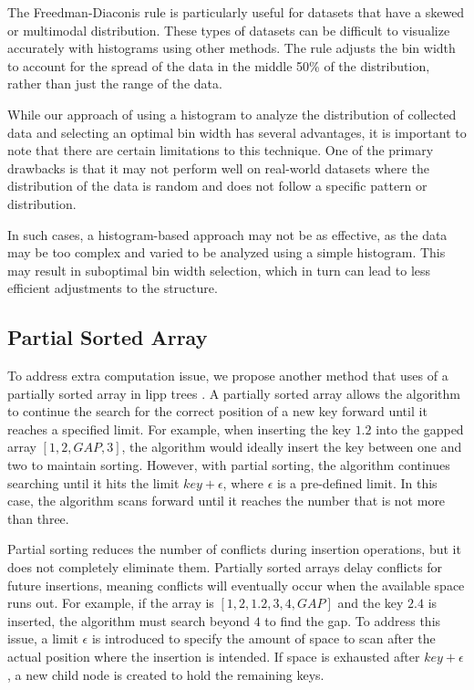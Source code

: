 The Freedman-Diaconis rule is particularly useful for datasets that have a skewed or multimodal distribution. These types of datasets can be difficult to visualize accurately with histograms using other methods. The rule adjusts the bin width to account for the spread of the data in the middle 50\% of the distribution, rather than just the range of the data. 

While our approach of using a histogram to analyze the distribution of collected data and selecting an optimal bin width has several advantages, it is important to note that there are certain limitations to this technique. One of the primary drawbacks is that it may not perform well on real-world datasets where the distribution of the data is random and does not follow a specific pattern or distribution.

In such cases, a histogram-based approach may not be as effective, as the data may be too complex and varied to be analyzed using a simple histogram. This may result in suboptimal bin width selection, which in turn can lead to less efficient adjustments to the \learnindex structure.



\subsection{Partial Sorted Array} \label{partialsorted}
To address extra computation issue, we propose another method that uses of a partially sorted array in \acrshort{lipp} trees \cite{partialMonotonic}. A partially sorted array allows the algorithm to continue the search for the correct position of a new key forward until it reaches a specified limit. For example, when inserting the key $1.2$ into the gapped array $[1,2, GAP,3]$, the algorithm would ideally insert the key between one and two to maintain sorting. However, with partial sorting, the algorithm continues searching until it hits the limit $key+\epsilon$, where $\epsilon$ is a pre-defined limit. In this case, the algorithm scans forward until it reaches the number that is not more than three.

Partial sorting reduces the number of conflicts during insertion operations, but it does not completely eliminate them. Partially sorted arrays delay conflicts for future insertions, meaning conflicts will eventually occur when the available space runs out. For example, if the array is $[1,2,1.2,3,4, GAP]$ and the key $2.4$ is inserted, the algorithm must search beyond $4$ to find the gap. To address this issue, a limit $\epsilon$ is introduced to specify the amount of space to scan after the actual position where the insertion is intended. If space is exhausted after $key + \epsilon$, a new child node is created to hold the remaining keys.

